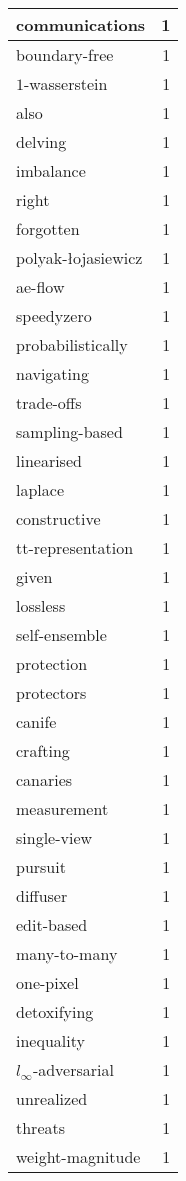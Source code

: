 \begin{table}[h]
\begin{tabular}{|l|r|}
\hline
communications & 1 \\
\hline
boundary-free & 1 \\
\hline
$1$-wasserstein & 1 \\
\hline
also & 1 \\
\hline
delving & 1 \\
\hline
imbalance & 1 \\
\hline
right & 1 \\
\hline
forgotten & 1 \\
\hline
polyak-{\l}ojasiewicz & 1 \\
\hline
ae-flow & 1 \\
\hline
speedyzero & 1 \\
\hline
probabilistically & 1 \\
\hline
navigating & 1 \\
\hline
trade-offs & 1 \\
\hline
sampling-based & 1 \\
\hline
linearised & 1 \\
\hline
laplace & 1 \\
\hline
constructive & 1 \\
\hline
tt-representation & 1 \\
\hline
given & 1 \\
\hline
lossless & 1 \\
\hline
self-ensemble & 1 \\
\hline
protection & 1 \\
\hline
protectors & 1 \\
\hline
canife & 1 \\
\hline
crafting & 1 \\
\hline
canaries & 1 \\
\hline
measurement & 1 \\
\hline
single-view & 1 \\
\hline
pursuit & 1 \\
\hline
diffuser & 1 \\
\hline
edit-based & 1 \\
\hline
many-to-many & 1 \\
\hline
one-pixel & 1 \\
\hline
detoxifying & 1 \\
\hline
inequality & 1 \\
\hline
$l_{\infty}$-adversarial & 1 \\
\hline
unrealized & 1 \\
\hline
threats & 1 \\
\hline
weight-magnitude & 1 \\

\end{tabular}
\end{table}
